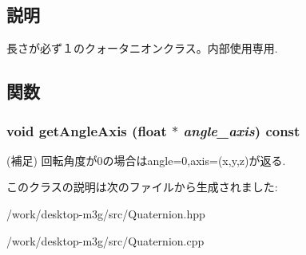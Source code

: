 \subsection{説明}
長さが必ず１のクォータニオンクラス。内部使用専用. 

\subsection{関数}
\hypertarget{classm3g_1_1Quaternion_3049675269aef6bb333d8f83fdf6eed7}{
\subsubsection[{getAngleAxis}]{\setlength{\rightskip}{0pt plus 5cm}void getAngleAxis (float $\ast$ {\em angle\_\-axis}) const}}
\label{classm3g_1_1Quaternion_3049675269aef6bb333d8f83fdf6eed7}


(補足) 回転角度が0の場合はangle=0,axis=(x,y,z)が返る. 

このクラスの説明は次のファイルから生成されました:\begin{CompactItemize}
\item 
/work/desktop-m3g/src/Quaternion.hpp\item 
/work/desktop-m3g/src/Quaternion.cpp\end{CompactItemize}
